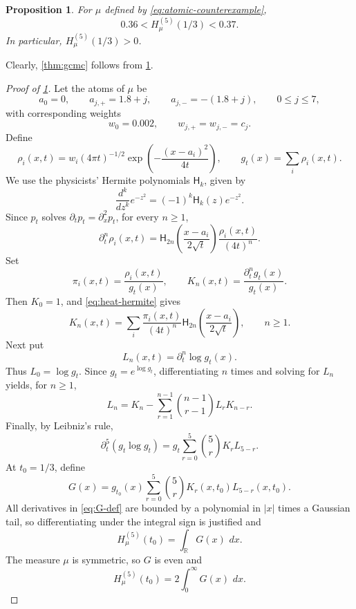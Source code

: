 \documentclass[11pt]{article}
\newtheorem{proposition}{Proposition}
\newcommand{\R}{\mathbb R}
\newcommand{\dd}{\,d}
\begin{document}
\begin{proposition}\label{prop:certified-fifth}
For \(\mu\) defined by \eqref{eq:atomic-counterexample},
\[
   0.36 < H_\mu^{(5)}(1/3) < 0.37 .
\]
In particular, \(H_\mu^{(5)}(1/3)>0\).
\end{proposition}
Clearly, \cref{thm:gcmc} follows from \cref{prop:certified-fifth}.

\begin{proof}[Proof of \cref{prop:certified-fifth}]
Let the atoms of \(\mu\) be
\[
   a_0=0,
   \qquad
   a_{j,+}=1.8+j,
   \qquad
   a_{j,-}=-(1.8+j),
   \qquad 0\le j\le 7,
\]
with corresponding weights
\[
   w_0=0.002,
   \qquad
   w_{j,+}=w_{j,-}=c_j.
\]
Define
\[
   \rho_i(x,t)
   =w_i(4\pi t)^{-1/2}
      \exp\left(-\frac{(x-a_i)^2}{4t}\right),
   \qquad
   g_t(x)=\sum_i\rho_i(x,t).
\]
We use the physicists' Hermite polynomials \(\mathsf H_k\), given by
\[
   \frac{d^k}{dz^k}e^{-z^2}=(-1)^k\mathsf H_k(z)e^{-z^2}.
\]
Since \(p_t\) solves \(\partial_t p_t=\partial_x^2p_t\), for every \(n\ge1\),
\begin{equation}\label{eq:heat-hermite}
   \partial_t^n\rho_i(x,t)
   =
   \mathsf H_{2n}\!\left(\frac{x-a_i}{2\sqrt t}\right)
   \frac{\rho_i(x,t)}{(4t)^n}.
\end{equation}
Set
\[
   \pi_i(x,t)=\frac{\rho_i(x,t)}{g_t(x)},
   \qquad
   K_n(x,t)=\frac{\partial_t^n g_t(x)}{g_t(x)}.
\]
Then \(K_0=1\), and \eqref{eq:heat-hermite} gives
\begin{equation}\label{eq:K-formula}
   K_n(x,t)
   =
   \sum_i 
   \frac{\pi_i(x,t)}{(4t)^{n}}   \mathsf H_{2n}\!\left(\frac{x-a_i}{2\sqrt t}\right),
   \qquad n\ge1 .
\end{equation}
Next put
\[
   L_n(x,t)=\partial_t^n\log g_t(x).
\]
Thus \(L_0=\log g_t\). Since \(g_t=e^{\log g_t}\), differentiating \(n\) times and solving for \(L_n\) yields, for \(n\ge1\),
\begin{equation}\label{eq:L-recursion}
   L_n
   =
   K_n
   -
   \sum_{r=1}^{n-1}
   \binom{n-1}{r-1}L_rK_{n-r}.
\end{equation}
Finally, by Leibniz's rule,
\begin{equation}\label{eq:G-def}
   \partial_t^5(g_t\log g_t)
   =
   g_t
   \sum_{r=0}^{5}\binom{5}{r}K_rL_{5-r}.
\end{equation}
At \(t_0=1/3\), define
\begin{equation}\label{eq:Gx-def}
   G(x)=
   g_{t_0}(x)
   \sum_{r=0}^{5}\binom{5}{r}K_r(x,t_0)L_{5-r}(x,t_0).
\end{equation}
All derivatives in \eqref{eq:G-def} are bounded by a polynomial in \(|x|\) times a Gaussian tail, so differentiating under the integral sign is justified and
\begin{equation}\label{eq:H5-integral}
   H_\mu^{(5)}(t_0)=\int_\R G(x)\,\dd x.
\end{equation}
The measure \(\mu\) is symmetric, so \(G\) is even and
\[
   H_\mu^{(5)}(t_0)=2\int_0^\infty G(x)\,\dd x.
\]


\end{proof}
\end{document}
